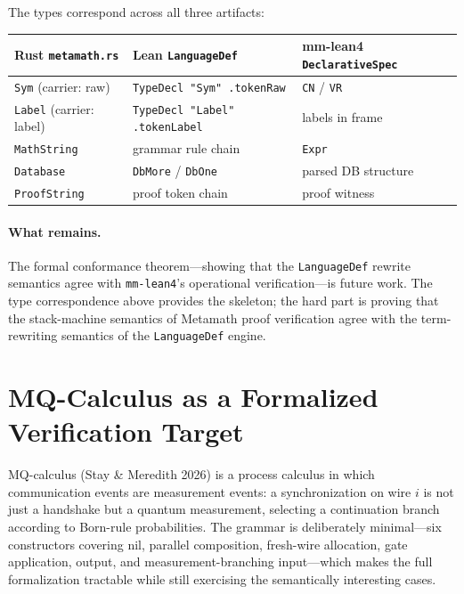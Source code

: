 \documentclass[11pt]{article}
\newcommand{\code}[1]{\texttt{#1}}
\begin{document}
The types correspond across all three artifacts:

\begin{center}
\begin{tabular}{lll}
\toprule
\textbf{Rust \code{metamath.rs}} & \textbf{Lean \code{LanguageDef}} & \textbf{mm-lean4 \code{DeclarativeSpec}} \\
\midrule
\code{Sym} (carrier: raw)   & \code{TypeDecl "Sym" .tokenRaw}   & \code{CN} / \code{VR} \\
\code{Label} (carrier: label) & \code{TypeDecl "Label" .tokenLabel} & labels in frame \\
\code{MathString}            & grammar rule chain                 & \code{Expr} \\
\code{Database}              & \code{DbMore} / \code{DbOne}       & parsed DB structure \\
\code{ProofString}           & proof token chain                  & proof witness \\
\bottomrule
\end{tabular}
\end{center}

\paragraph{What remains.}
The formal conformance theorem---showing that the \code{LanguageDef} rewrite
semantics agree with \code{mm-lean4}'s operational verification---is future
work.  The type correspondence above provides the skeleton; the hard part
is proving that the stack-machine semantics of Metamath proof verification
agree with the term-rewriting semantics of the \code{LanguageDef} engine.

\section{MQ-Calculus as a Formalized Verification Target}

MQ-calculus (Stay \& Meredith 2026) is a process calculus in which communication
events are measurement events: a synchronization on wire $i$ is not just a
handshake but a quantum measurement, selecting a continuation branch according
to Born-rule probabilities.  The grammar is deliberately minimal---six
constructors covering nil, parallel composition, fresh-wire allocation, gate
application, output, and measurement-branching input---which makes the full
formalization tractable while still exercising the semantically interesting cases.
\end{document}

